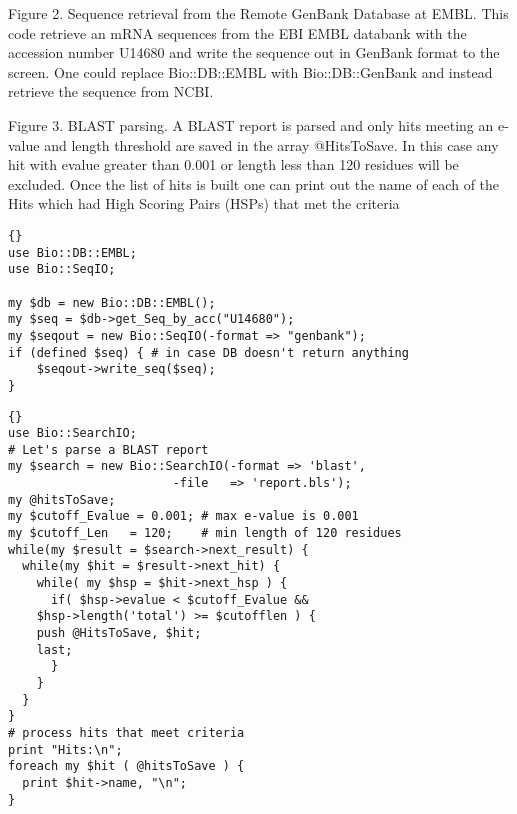 \documentclass[12pt]{article}
\begin{document}
Figure 2. Sequence retrieval from the Remote GenBank Database at EMBL.
This code retrieve an mRNA sequences from the EBI EMBL databank with
the accession number U14680 and write the sequence out in GenBank
format to the screen.  One could replace Bio::DB::EMBL with
Bio::DB::GenBank and instead retrieve the sequence from NCBI.

\newpage


Figure 3. BLAST parsing. A BLAST report is parsed and only hits meeting
an e-value and length threshold are saved in the array @HitsToSave.  
In this case any hit with evalue greater than 0.001 or length less 
than 120 residues will be excluded.  Once the list of hits is built 
one can print out the name of each of the Hits which had High Scoring
Pairs (HSPs) that met the criteria

\newpage


\centerline{}

\newpage

\singlespacing



\begin{scriptsize}
\begin{lstlisting}{}
use Bio::DB::EMBL;
use Bio::SeqIO;

my $db = new Bio::DB::EMBL();
my $seq = $db->get_Seq_by_acc("U14680");
my $seqout = new Bio::SeqIO(-format => "genbank");
if (defined $seq) { # in case DB doesn't return anything
    $seqout->write_seq($seq);
}
\end{lstlisting}
\end{scriptsize}


\newpage

\begin{scriptsize}
\begin{lstlisting}{}
use Bio::SearchIO;
# Let's parse a BLAST report 
my $search = new Bio::SearchIO(-format => 'blast',
          		       -file   => 'report.bls');
my @hitsToSave;
my $cutoff_Evalue = 0.001; # max e-value is 0.001
my $cutoff_Len   = 120;    # min length of 120 residues
while(my $result = $search->next_result) {
  while(my $hit = $result->next_hit) {
    while( my $hsp = $hit->next_hsp ) {
      if( $hsp->evalue < $cutoff_Evalue && 
	$hsp->length('total') >= $cutofflen ) { 
	push @HitsToSave, $hit;
	last;
      } 
    }
  }
}
# process hits that meet criteria
print "Hits:\n";
foreach my $hit ( @hitsToSave ) {
  print $hit->name, "\n";	
}

\end{lstlisting}
\end{scriptsize}
\end{document}
